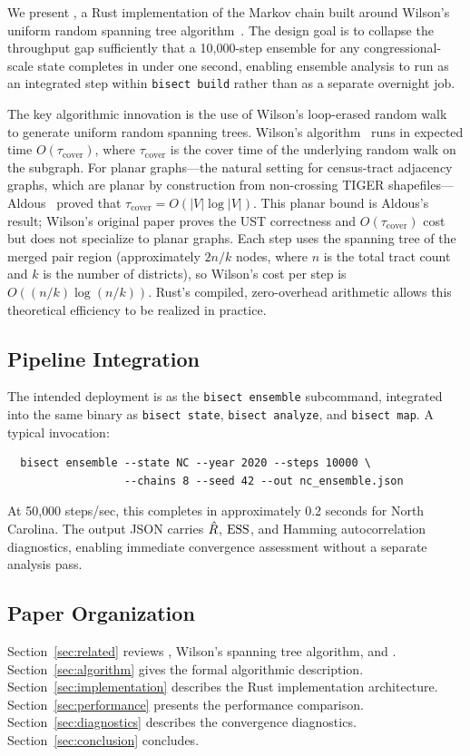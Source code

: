 We present \re{}, a Rust implementation of the \recom{} Markov chain
built around Wilson's uniform random spanning tree
algorithm~\citep{wilson1996generating}.
The design goal is to collapse the throughput gap sufficiently that
a 10{,}000-step ensemble for any congressional-scale state completes in
under one second, enabling ensemble analysis to run as an integrated step
within \texttt{bisect build} rather than as a separate overnight job.

The key algorithmic innovation is the use of Wilson's loop-erased random
walk~\citep{lawler1980loop} to generate uniform random spanning trees.
Wilson's algorithm~\citep{wilson1996generating} runs in expected time
$O(\tau_{\mathrm{cover}})$, where $\tau_{\mathrm{cover}}$ is the
cover time of the underlying random walk on the subgraph.
For planar graphs---the natural setting for census-tract adjacency
graphs, which are planar by construction from non-crossing TIGER
shapefiles---Aldous~\citeyearpar{aldous1991random} proved that
$\tau_{\mathrm{cover}} = O(|V|\log|V|)$.
This planar bound is Aldous's result; Wilson's original paper proves the
UST correctness and $O(\tau_{\mathrm{cover}})$ cost but does not specialize
to planar graphs.
Each \recom{} step uses the spanning tree of the merged pair region
(approximately $2n/k$ nodes, where $n$ is the total tract count and $k$
is the number of districts), so Wilson's cost per step is
$O((n/k)\log(n/k))$.
Rust's compiled, zero-overhead arithmetic allows this theoretical
efficiency to be realized in practice.

\subsection{Pipeline Integration}

The intended deployment is as the \texttt{bisect ensemble} subcommand,
integrated into the same binary as \texttt{bisect state},
\texttt{bisect analyze}, and \texttt{bisect map}.
A typical invocation:

\begin{verbatim}
  bisect ensemble --state NC --year 2020 --steps 10000 \
                  --chains 8 --seed 42 --out nc_ensemble.json
\end{verbatim}

At 50{,}000 steps/sec, this completes in approximately 0.2 seconds for
North Carolina.
The output JSON carries $\hat{R}$, $\mathrm{ESS}$, and Hamming autocorrelation
diagnostics, enabling immediate convergence assessment without a separate
analysis pass.

\subsection{Paper Organization}

Section~\ref{sec:related} reviews \recom{}, Wilson's spanning tree
algorithm, and \gc{}.
Section~\ref{sec:algorithm} gives the formal algorithmic description.
Section~\ref{sec:implementation} describes the Rust implementation
architecture.
Section~\ref{sec:performance} presents the performance comparison.
Section~\ref{sec:diagnostics} describes the convergence diagnostics.
Section~\ref{sec:conclusion} concludes.

